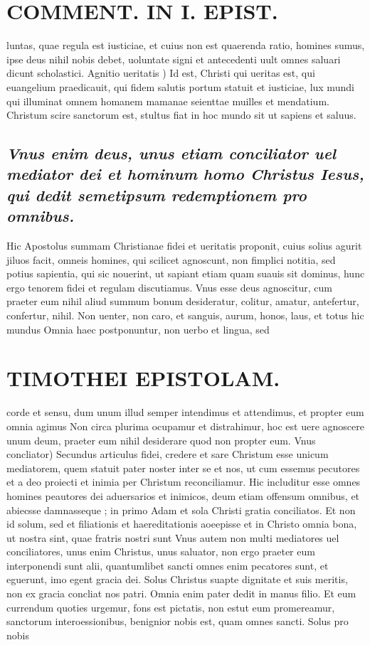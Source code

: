 \documentclass{article}
\begin{document}
\begin{pages}
\section*{COMMENT. IN I. EPIST. }
\marginpar{[ p.48 ]}\pstart luntas, quae regula est iusticiae, et cuius non est quaerenda ratio, homines sumus, ipse deus nihil nobis debet, uoluntate signi et antecedenti uult omnes saluari dicunt scholastici.  \pend\pstart Agnitio ueritatis ) Id est, Christi qui ueritas est, qui euangelium praedicauit, qui fidem salutis portum statuit et iusticiae, lux mundi qui illuminat omnem homanem mamanae seienttae muilles et mendatium. Christum scire sanctorum est, stultus fiat in hoc mundo sit ut sapiens et saluus.  \pend
{}
{}
\subsection*{\textit{Vnus enim deus, unus etiam conciliator uel mediator dei et hominum homo Christus Iesus, qui dedit semetipsum redemptionem pro omnibus. }}\pstart Hic Apostolus summam Christianae fidei et ueritatis proponit, cuius solius agurit jiluos facit, omneis homines, qui scilicet agnoscunt, non fimplici notitia, sed potius sapientia, qui sic nouerint, ut sapiant etiam quam suauis sit dominus, hunc ergo tenorem fidei et regulam discutiamus.  \pend\pstart Vnus esse deus agnoscitur, cum praeter eum nihil aliud summum bonum desideratur, colitur, amatur, antefertur, confertur, nihil. Non uenter, non caro, et sanguis, aurum, honos, laus, et totus hic mundus Omnia haec postponuntur, non uerbo et lingua, sed  \pend
\section*{TIMOTHEI EPISTOLAM. }
\marginpar{[ p.49 ]}\pstart corde et sensu, dum unum illud semper intendimus et attendimus, et propter eum omnia agimus Non circa plurima ocupamur et distrahimur, hoc est uere agnoscere unum deum, praeter eum nihil desiderare quod non propter eum.  \pend\pstart Vnus concliator) Secundus articulus fidei, credere et sare Christum esse unicum mediatorem, quem statuit pater noster inter se et nos, ut cum essemus pecutores et a deo proiecti et inimia per Christum reconciliamur. Hic includitur esse omnes homines peautores dei aduersarios et inimicos, deum etiam offensum omnibus, et abiecsse damnasseque ; in primo Adam et sola Christi gratia conciliatos. Et non id solum, sed et filiationis et haereditationis aoeepisse et in Christo omnia bona, ut nostra sint, quae fratris nostri sunt Vnus autem non multi mediatores uel conciliatores, unus enim Christus, unus saluator, non ergo praeter eum interponendi sunt alii, quantumlibet sancti omnes enim pecatores sunt, et eguerunt, imo egent gracia dei. Solus Christus suapte dignitate et suis meritis, non ex gracia concliat nos patri. Omnia enim pater dedit in manus filio. Et eum currendum quoties urgemur, fons est pictatis, non estut eum promereamur, sanctorum interoessionibus, benignior nobis est, quam omnes sancti. Solus pro nobis  \pend

\end{pages}
\end{document}
